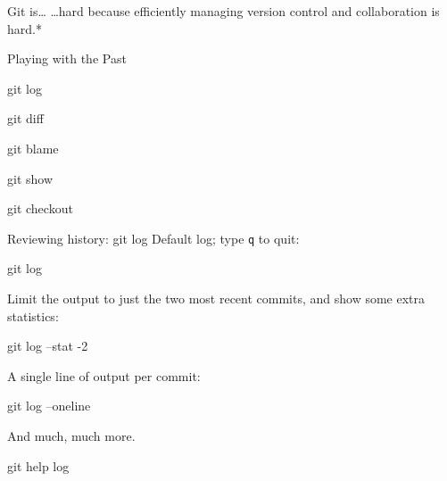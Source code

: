 \begin{frame}{Git is\ldots}
  \hangindent=26pt \huge {
  \ldots hard because efficiently managing version control and collaboration is
  hard.*
  }
\end{frame}

\begin{frame}[fragile]{Playing with the Past}
  \begin{gitCommand}git log\end{gitCommand}
  \begin{gitCommand}git diff\end{gitCommand}
  \begin{gitCommand}git blame\end{gitCommand}
  \begin{gitCommand}git show\end{gitCommand}
  \begin{gitCommand}git checkout\end{gitCommand}
\end{frame}

\begin{frame}[fragile]{Reviewing history: git log}
  Default log; type \texttt{q} to quit:

  \begin{gitCommand}git log\end{gitCommand}

  Limit the output to just the two most recent commits, and show some extra
  statistics:

  \begin{gitCommand}git log --stat -2\end{gitCommand}

  A single line of output per commit:

  \begin{gitCommand}git log --oneline\end{gitCommand}

  And much, much more.

  \begin{gitCommand}git help log\end{gitCommand}
\end{frame}


